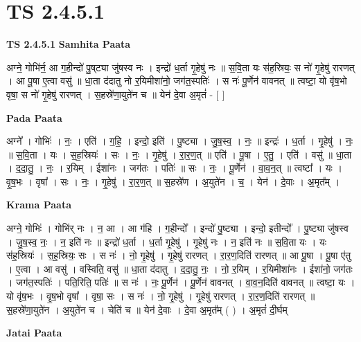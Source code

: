 \documentclass[17pt]{extarticle}
\begin{document}
\section*{ TS 2.4.5.1 }

\textbf{TS 2.4.5.1 } \newline
\textbf{Samhita Paata} \newline

अग्ने॒ गोभि॑र्न॒ आ ग॒हीन्दो॑ पु॒ष्‌ट्या जु॑षस्व नः । इन्द्रो॑ ध॒र्ता गृ॒हेषु॑ नः ॥ स॒वि॒ता यः स॑ह॒स्रियः॒ स नो॑ गृ॒हेषु॑ रारणत् । आ पू॒षा ए॒त्वा वसु॑ ॥ धा॒ता द॑दातु नो र॒यिमीशा॑नो॒ जग॑त॒स्पतिः॑ । स नः॑ पू॒र्णेन॑ वावनत् ॥ त्वष्टा॒ यो वृ॑ष॒भो वृषा॒ स नो॑ गृ॒हेषु॑ रारणत् । स॒हस्रे॑णा॒युते॑न च ॥ येन॑ दे॒वा अ॒मृतं॑ - [  ] \newline

\textbf{Pada Paata} \newline

अग्ने᳚ । गोभिः॑ । नः॒ । एति॑ । ग॒हि॒ । इन्दो॒ इति॑ । पु॒ष्ट्या । जु॒ष॒स्व॒ । नः॒ ॥ इन्द्रः॑ । ध॒र्ता । गृ॒हेषु॑ । नः॒ ॥ स॒वि॒ता । यः । स॒ह॒स्रियः॑ । सः । नः॒ । गृ॒हेषु॑ । रा॒र॒ण॒त् ॥ एति॑ । पू॒षा । ए॒तु॒ । एति॑ । वसु॑ ॥ धा॒ता । द॒दा॒तु॒ । नः॒ । र॒यिम् । ईशा॑नः । जग॑तः । पतिः॑ ॥ सः । नः॒ । पू॒र्णेन॑ । वा॒व॒न॒त् ॥ त्वष्टा᳚ । यः । वृ॒ष॒भः । वृषा᳚ । सः । नः॒ । गृ॒हेषु॑ । रा॒र॒ण॒त् ॥ स॒हस्रे॑ण । अ॒युते॑न । च॒ । येन॑ । दे॒वाः । अ॒मृत᳚म् ।  \newline


\textbf{Krama Paata} \newline

अग्ने॒ गोभिः॑ । गोभि॑र् नः । न॒ आ । आ ग॑हि । ग॒हीन्दो᳚ । इन्दो॑ पु॒ष्ट्या । इन्दो॒ इतीन्दो᳚ । पु॒ष्ट्या जु॑षस्व । जु॒ष॒स्व॒ नः॒ । न॒ इति॑ नः ॥ इन्द्रो॑ ध॒र्ता । ध॒र्ता गृ॒हेषु॑ । गृ॒हेषु॑ नः । न॒ इति॑ नः ॥ स॒वि॒ता यः । यः स॑ह॒स्रियः॑ । स॒ह॒स्रियः॒ सः । स नः॑ । नो॒ गृ॒हेषु॑ । गृ॒हेषु॑ रारणत् । रा॒र॒ण॒दिति॑ रारणत् ॥ आ पू॒षा । पू॒षा ए॑तु । ए॒त्वा । आ वसु॑ । वस्विति॒ वसु॑ ॥ धा॒ता द॑दातु । द॒दा॒तु॒ नः॒ । नो॒ र॒यिम् । र॒यिमीशा॑नः । ईशा॑नो॒ जग॑तः । जग॑त॒स्पतिः॑ । पति॒रिति॒ पतिः॑ ॥ स नः॑ । नः॒ पू॒र्णेन॑ । पू॒र्णेन॑ वावनत् । वा॒व॒न॒दिति॑ वावनत् ॥ त्वष्टा॒ यः । यो वृ॑ष॒भः । वृ॒ष॒भो वृषा᳚ । वृषा॒ सः । स नः॑ । नो॒ गृ॒हेषु॑ । गृ॒हेषु॑ रारणत् । रा॒र॒ण॒दिति॑ रारणत् ॥ स॒हस्रे॑णा॒युते॑न । अ॒युते॑न च । चेति॑ च ॥ येन॑ दे॒वाः । दे॒वा अ॒मृत᳚म् ( ) । अ॒मृतं॑ दी॒र्घम् \newline

\textbf{Jatai Paata} \newline
\end{document}
